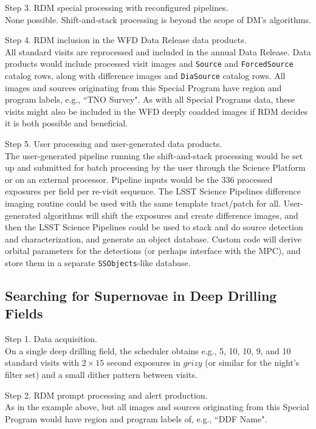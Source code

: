 Step 3. RDM special processing with reconfigured pipelines. \\
None possible. 
Shift-and-stack processing is beyond the scope of DM's algorithms.

Step 4. RDM inclusion in the WFD Data Release data products. \\
All standard visits are reprocessed and included in the annual Data Release.
Data products would include processed visit images and {\tt Source} and {\tt ForcedSource}
catalog rows, along with difference images and {\tt DiaSource} catalog rows.
All images and sources originating from this Special Program have 
region and program labels, e.g., ``TNO Survey".
As with all Special Programs data, these visits might also be included in the 
WFD deeply coadded images if RDM decides it is both possible and beneficial. 

Step 5. User processing and user-generated data products. \\
The user-generated pipeline running the shift-and-stack processing would be set up and submitted 
for batch processing by the user through the Science Platform or on an external processor. 
Pipeline inputs would be the 336 processed exposures per field per re-visit sequence. 
The LSST Science Pipelines difference imaging routine could be used with the same template tract/patch for all. 
User-generated algorithms will shift the exposures and create difference images, and then the LSST
Science Pipelines could be used to stack and do source detection and characterization, 
and generate an object database. 
Custom code will derive orbital parameters for the detections (or perhaps interface with the MPC),
and store them in a separate {\tt SSObjects}-like database.


\subsection{Searching for Supernovae in Deep Drilling Fields}\label{ssec:SPCS_SNDDF}

Step 1. Data acquisition. \\
On a single deep drilling field, the scheduler obtains e.g., 5, 10, 10, 9, and 10 standard visits 
with $2\times15$ second exposures in $grizy$ (or similar for the night's filter set) 
and a small dither pattern between visits.

Step 2. RDM prompt processing and alert production. \\
As in the example above, but all images and sources originating from this Special Program would have 
region and program labels of, e.g., ``DDF Name".

